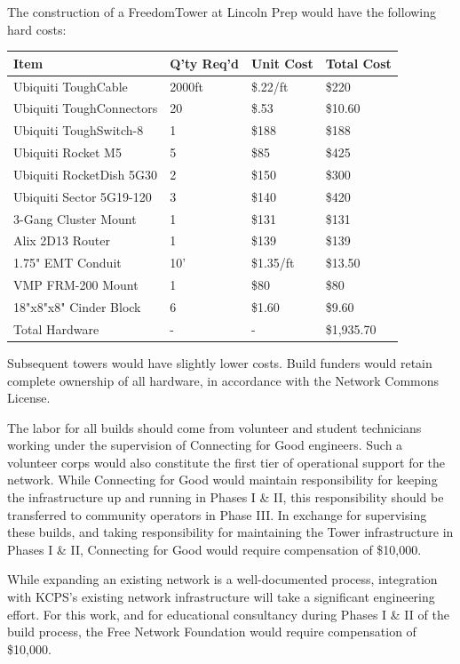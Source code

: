 The construction of a FreedomTower at Lincoln Prep would
have the following hard costs:
\begin{center}
\begin{tabular}{|p{5cm}|l|l|l|}
\hline
Item & Q'ty Req'd & Unit Cost & Total Cost \\ \hline
Ubiquiti ToughCable & 2000ft & \$.22/ft & \$220 \\ \hline
Ubiquiti ToughConnectors & 20 & \$.53 & \$10.60 \\ \hline
Ubiquiti ToughSwitch-8 & 1 & \$188 & \$188 \\ \hline
Ubiquiti Rocket M5 & 5 & \$85 & \$425 \\ \hline
Ubiquiti RocketDish 5G30 & 2 & \$150 & \$300 \\ \hline
Ubiquiti Sector 5G19-120 & 3 & \$140 & \$420 \\ \hline
3-Gang Cluster Mount & 1 & \$131 & \$131 \\ \hline
Alix 2D13 Router & 1 & \$139 & \$139 \\ \hline
1.75" EMT Conduit & 10' & \$1.35/ft & \$13.50 \\ \hline
VMP FRM-200 Mount & 1 & \$80 & \$80 \\ \hline
18"x8"x8" Cinder Block & 6 & \$1.60 & \$9.60 \\ \hline
Total Hardware & - & - & \$1,935.70 \\ \hline
\end{tabular}
\end{center}
Subsequent towers would have slightly lower costs. Build funders would retain
complete ownership of all hardware, in accordance with the Network Commons
License.\par

The labor for all builds should come from volunteer and student technicians working
under the supervision of Connecting for Good engineers. Such a volunteer corps
would also constitute the first tier of operational support for the network.
While Connecting for Good would maintain responsibility for keeping the
infrastructure up and running in Phases I \& II, this responsibility should be
transferred to community operators in Phase III. In exchange for supervising
these builds, and taking responsibility for maintaining the Tower infrastructure
in Phases I \& II, Connecting for Good would require compensation of \$10,000. \par

While expanding an existing network is a well-documented process, integration
with KCPS's existing network infrastructure will take a significant engineering
effort. For this work, and for educational consultancy during Phases I \& II of
the build process, the Free Network Foundation would require compensation of
\$10,000.

